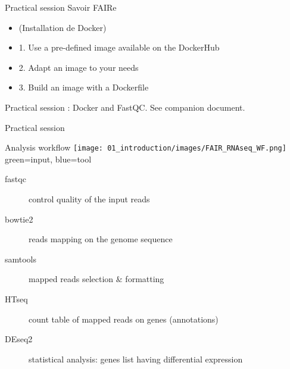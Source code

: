 \begin{frame}{Practical session}
Savoir FAIRe

\begin{itemize}
  \item (Installation de Docker)
  \item 1. Use a pre-defined image available on the DockerHub
  \item 2. Adapt an image to your needs
  \item 3. Build an image with a Dockerfile
\end{itemize}

Practical session : Docker and FastQC. See companion document.

\end{frame}

\begin{frame}{Practical session}
\begin{block}{Analysis workflow}
    \texttt{[image: 01\_introduction/images/FAIR\_RNAseq\_WF.png]}\\
green=input, blue=tool
\end{block}
\footnotesize{
\begin{description}
    \item[fastqc] control quality of the input reads
    \item[bowtie2] reads mapping on the genome sequence
    \item[samtools] mapped reads selection $\&$ formatting
    \item[HTseq] count table of mapped reads on genes (annotations)
    \item[DEseq2] statistical analysis: genes list having differential expression
\end{description}
}
\end{frame}

